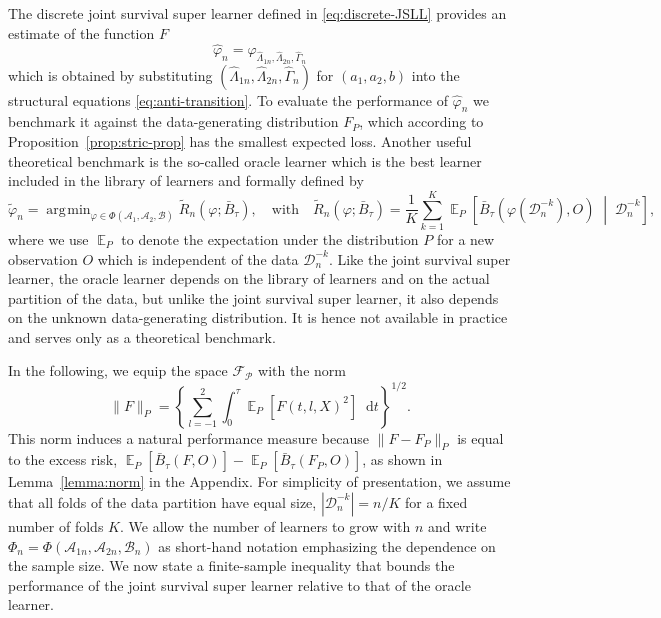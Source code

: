 \documentclass[alpha-refs]{wiley-article}
\DeclareMathOperator{\E}{\mathbb{E}} %
\renewcommand{\phi}{\varphi}
\newcommand*\diff{\mathop{}\!\mathrm{d}}
\newcommand{\midd}{\; \middle|\;}
\newcommand{\1}{\mathbb{1}}
\DeclareMathOperator*{\argmin}{\arg\!\min}
\newcommand{\data}{\ensuremath{\mathcal{D}}}
\begin{document}
The discrete joint survival super learner defined in
\eqref{eq:discrete-JSLL} provides an estimate of the function \(F\)
\begin{equation*}
  \hat{\phi}_n=\phi_{\hat \Lambda_{1n},\hat \Lambda_{2n}, \hat \Gamma_{n}}
\end{equation*}
which is obtained by substituting
\((\hat \Lambda_{1n},\hat \Lambda_{2n}, \hat \Gamma_{n})\) for
\((a_1,a_2,b)\) into the structural equations
\eqref{eq:anti-transition}. To evaluate the performance of
\(\hat{\phi}_n\) we benchmark it against the data-generating
distribution \( F_P \), which according to
Proposition~\ref{prop:stric-prop} has the smallest expected
loss. Another useful theoretical benchmark is the so-called oracle
learner which is the best learner included in the library of learners
and formally defined by
\begin{equation*}
  \tilde{\phi}_n
  =  \argmin_{\phi \in \Phi(\mathcal{A}_1, \mathcal{A}_2, \mathcal{B}) }
  \tilde{R}_{n}(\phi ; \bar{B}_{\tau}),
  \quad \text{with} \quad 
  \tilde{R}_n(\phi; \bar{B}_{\tau})=
  \frac{1}{K}\sum_{k=1}^{K} 
  \E_P{
    \left[
      \bar{B}_{\tau}
      {
        \left(
          \phi{ (\data_n^{-k})}
          , O
        \right)
      } 
      \midd  \data_n^{-k}
    \right]}
  ,
\end{equation*}
where we use \( \E_P \) to denote the expectation
under the distribution \( P \) for a new observation \( O \) which is
independent of the data \( \data_n^{-k} \). Like the joint survival
super learner, the oracle learner depends on the library of learners
and on the actual partition of the data, but unlike the joint survival
super learner, it also depends on the unknown data-generating
distribution. It is hence not available in practice and serves only as
a theoretical benchmark.

In the following, we equip the space \( \mathcal{F}_{\mathcal{P}} \)
with the norm
\begin{equation}
  \label{eq:norm}
  \| F \|_{P} = 
  \left\{
    \sum_{l=-1}^{2}
    \int_0^{\tau} \E_P{\left[ F(t, l, X)^2 \right]} \diff t
  \right\}^{1/2}.
\end{equation}
This norm induces a natural performance measure because
$\| F-F_P \|_{P}$ is equal to the excess risk,
\( \E_P{[\bar{B}_\tau(F, O)]} - \E_P{[\bar{B}_\tau(F_P, O)]} \), as
shown in Lemma~\ref{lemma:norm} in the Appendix. For simplicity of
presentation, we assume that all folds of the data partition have
equal size, \( |\data_n^{-k}| = n/K \) for a fixed number of folds
\( K \). We allow the number of learners to grow with \( n \) and
write
\( \Phi_n=\Phi(\mathcal{A}_{1n}, \mathcal{A}_{2n},
\mathcal{B}_n)\) as short-hand notation emphasizing the dependence on
the sample size. We now state a finite-sample inequality that bounds
the performance of the joint survival super learner relative to that
of the oracle learner.
\end{document}
